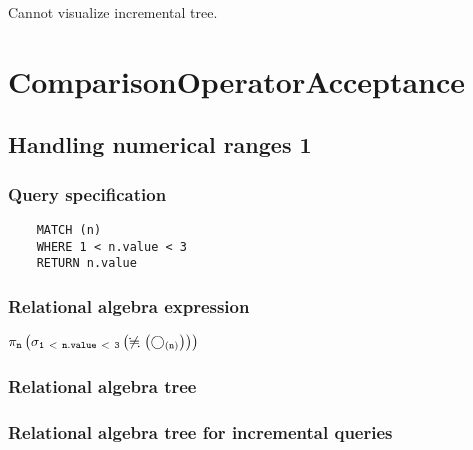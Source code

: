 	Cannot visualize incremental tree.

	\section{ComparisonOperatorAcceptance}

	\subsection{Handling numerical ranges 1}

	\subsubsection*{Query specification}

	\begin{lstlisting}
	MATCH (n)
	WHERE 1 < n.value < 3
	RETURN n.value
	\end{lstlisting}


	\subsubsection*{Relational algebra expression}

	$\projection{\var{n}} \left(\selection{\mathtt{1~<~n.value~<~3}} \left(\alldifferent{} \left(\getvertices{n}{}\right)\right)\right)$

	\subsubsection*{Relational algebra tree}


	\subsubsection*{Relational algebra tree for incremental queries}

